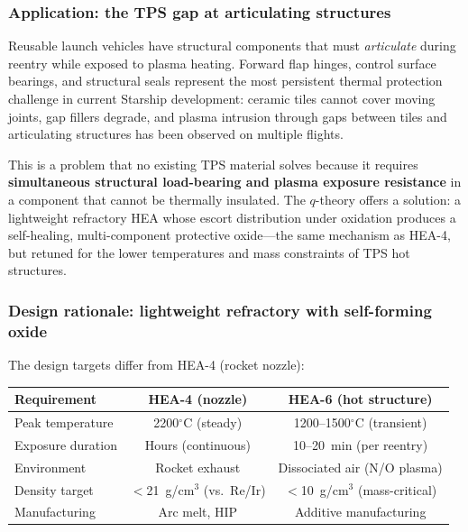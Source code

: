 \documentclass[12pt,letterpaper]{article}
\theoremstyle{definition}
\begin{document}
\subsubsection{Application: the TPS gap at articulating structures}

Reusable launch vehicles have structural components that must \emph{articulate} during reentry while exposed to plasma heating.  Forward flap hinges, control surface bearings, and structural seals represent the most persistent thermal protection challenge in current Starship development: ceramic tiles cannot cover moving joints, gap fillers degrade, and plasma intrusion through gaps between tiles and articulating structures has been observed on multiple flights.

This is a problem that no existing TPS material solves because it requires \textbf{simultaneous structural load-bearing and plasma exposure resistance} in a component that cannot be thermally insulated.  The $q$-theory offers a solution: a lightweight refractory HEA whose escort distribution under oxidation produces a self-healing, multi-component protective oxide---the same mechanism as HEA-4, but retuned for the lower temperatures and mass constraints of TPS hot structures.

\subsubsection{Design rationale: lightweight refractory with self-forming oxide}

The design targets differ from HEA-4 (rocket nozzle):

\begin{center}
\begin{tabular}{@{}lcc@{}}
\toprule
Requirement & HEA-4 (nozzle) & HEA-6 (hot structure) \\
\midrule
Peak temperature & 2200$^\circ$C (steady) & 1200--1500$^\circ$C (transient) \\
Exposure duration & Hours (continuous) & 10--20~min (per reentry) \\
Environment & Rocket exhaust & Dissociated air (N/O plasma) \\
Density target & $<$21~g/cm$^3$ (vs.\ Re/Ir) & $<$10~g/cm$^3$ (mass-critical) \\
Manufacturing & Arc melt, HIP & Additive manufacturing \\
\bottomrule
\end{tabular}
\end{center}
\end{document}
